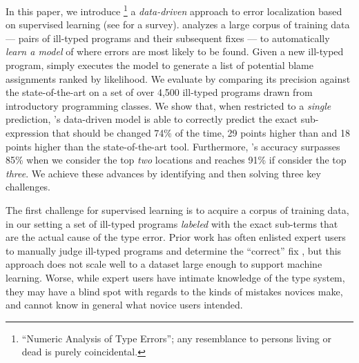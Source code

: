%
In this paper, we introduce \toolname
\footnote{``Numeric Analysis of Type Errors''; any resemblance to persons living or dead is purely coincidental.}
a \emph{data-driven} approach to error
localization based on supervised
learning (see \citealt{Kotsiantis2007-pj} for a survey).
%
\toolname analyzes a large corpus
of training data --- pairs of ill-typed
programs and their subsequent fixes ---
to automatically \emph{learn a model}
of where errors are most likely to
be found.
%
Given a new ill-typed program,
\toolname simply executes the model
to generate a list of potential
blame assignments ranked by likelihood.
%
We evaluate \toolname by comparing its
precision against the state-of-the-art
on a set of over 4,500 ill-typed \ocaml
programs drawn from introductory
programming classes.
%
We show that, when restricted to a
\emph{single} prediction, \toolname's data-driven
model is able to correctly predict
the exact sub-expression that should
be changed 74\% of the time,
29 points higher than \ocaml and
18 points higher than the state-of-the-art
\sherrloc tool.
%
Furthermore, \toolname's accuracy surpasses
85\% when we consider the top \emph{two}
locations and reaches 91\% if consider
the top \emph{three}.
%
We achieve these advances by identifying
and then solving three key challenges.

%
The first challenge for supervised learning
is to acquire a corpus of training data, in our setting
a set of ill-typed programs \emph{labeled}
with the exact sub-terms that are the actual
cause of the type error.
%
Prior work has often enlisted expert users
to manually judge ill-typed programs and
determine the ``correct'' fix
\citep[\eg][]{Lerner2007-dt,Loncaric2016-uk},
but this approach does not scale well to
a dataset large enough to support machine
learning.
%
Worse, while expert users have intimate
knowledge of the type system, they may
have a blind spot with regards to the
kinds of mistakes novices make, and
cannot know in general what novice users
intended.

